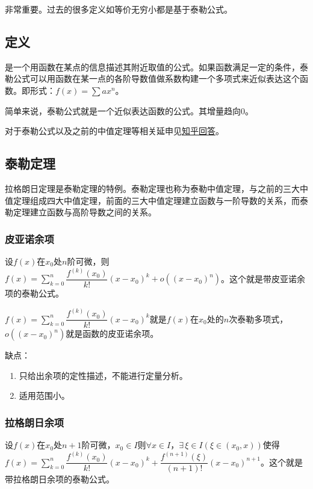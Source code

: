 \documentclass[UTF8, 12pt]{ctexart}
\begin{document}
非常重要。过去的很多定义如等价无穷小都是基于泰勒公式。

\subsection{定义}

是一个用函数在某点的信息描述其附近取值的公式。如果函数满足一定的条件，泰勒公式可以用函数在某一点的各阶导数值做系数构建一个多项式来近似表达这个函数。即形式：$f(x)=\sum ax^n$。

简单来说，泰勒公式就是一个近似表达函数的公式。其增量趋向0。

对于泰勒公式以及之前的中值定理等相关延申见\href{https://www.zhihu.com/question/25627482}{知乎回答}。

\subsection{泰勒定理}

拉格朗日定理是泰勒定理的特例。泰勒定理也称为泰勒中值定理，与之前的三大中值定理组成四大中值定理，前面的三大中值定理建立函数与一阶导数的关系，而泰勒定理建立函数与高阶导数之间的关系。

\subsubsection{皮亚诺余项}

设$f(x)$在$x_0$处$n$阶可微，则$f(x)=\sum\limits_{k=0}^n\dfrac{f^{(k)}(x_0)}{k!}(x-x_0)^k+o((x-x_0)^n)$。这个就是带皮亚诺余项的泰勒公式。\medskip

$f(x)=\sum\limits_{k=0}^n\dfrac{f^{(k)}(x_0)}{k!}(x-x_0)^k$就是$f(x)$在$x_0$处的$n$次泰勒多项式，$o((x-x_0)^n)$就是函数的皮亚诺余项。

缺点：

\begin{enumerate}
    \item 只给出余项的定性描述，不能进行定量分析。
    \item 适用范围小。
\end{enumerate}

\subsubsection{拉格朗日余项}

设$f(x)$在$x_0$处$n+1$阶可微，$x_0\in I$则$\forall x\in I$，$\exists\,\xi\in I(\xi\in(x_0,x))$使得$f(x)=\sum\limits_{k=0}^n\dfrac{f^{(k)}(x_0)}{k!}(x-x_0)^k+\dfrac{f^{(n+1)}(\xi)}{(n+1)!}(x-x_0)^{n+1}$。这个就是带拉格朗日余项的泰勒公式。
\end{document}
